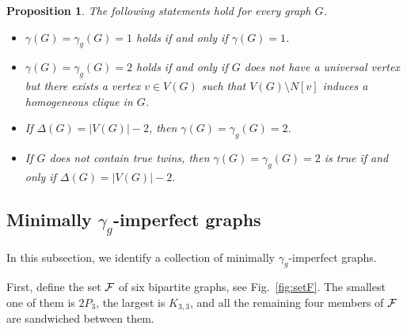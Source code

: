 \documentclass[12pt]{article}
\newtheorem{proposition}[theorem]{Proposition}
\newcommand{\cF}{{\cal F}}
\begin{document}
\begin{proposition} 
	\label{lemma:1-2}
The following statements hold for every graph $G$.
	\begin{itemize}
		\item[$(i)$] $\gamma(G)=\gamma_g(G)=1$ holds if and only if $\gamma(G)=1$.  
		\item[$(ii)$] $\gamma(G)=\gamma_g(G)=2$ holds if and only if $G$ does not have a universal vertex but there exists a vertex $v\in V(G)$ such that $V(G)\setminus N\left[v \right]$ induces a homogeneous clique in $G$.
		\item[$(iii)$] If  $\Delta(G)= |V(G)|-2$, then $\gamma(G)=\gamma_g(G)=2$.
		\item[$(iv)$] If $G$ does not contain true twins, then  $\gamma(G)=\gamma_g(G)=2$ is true if and only if $\Delta(G)= |V(G)|-2$.
			\end{itemize}
\end{proposition} 


\subsection{Minimally $\gamma_g$-imperfect graphs}
\label{subsec:imperfect}

In this subsection, we identify a collection of minimally $\gamma_g$-imperfect graphs. 

First, define the set $\cF$ of six bipartite graphs,  see Fig.~\ref{fig:setF}. The smallest one of them is $2P_3$, the largest is $K_{3,3}$, and all the remaining four members of $\cF$ are sandwiched between them. 
\end{document}
